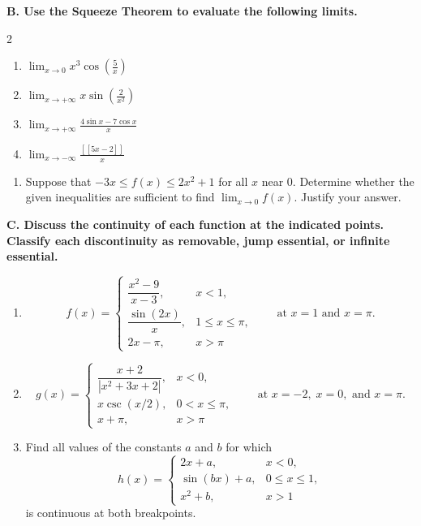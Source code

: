 \medskip
\noindent\textbf{B. Use the Squeeze Theorem to evaluate the following limits.}
\begin{multicols}{2}
\begin{enumerate}
    \setlength{\itemsep}{3pt}
    \setlength{\parsep}{0pt}
    \setlength{\topsep}{2pt}
    \setcounter{enumi}{10}
    \item \(\displaystyle \lim_{x \to 0} x^{3} \cos\!\left(\frac{5}{x}\right)\)
    \item \(\displaystyle \lim_{x \to +\infty} x \sin\!\left(\frac{2}{x^{2}}\right)\)
    \item \(\displaystyle \lim_{x \to +\infty} \frac{4\sin x - 7\cos x}{x}\)
    \item \(\displaystyle \lim_{x \to -\infty} \frac{[\![5x - 2]\!]}{x}\)
\end{enumerate}
\end{multicols}
\begin{enumerate}
    \setlength{\itemsep}{3pt}
    \setlength{\parsep}{0pt}
    \setlength{\topsep}{0pt}
    \setcounter{enumi}{14}
    \item Suppose that \(-3x \leq f(x) \leq 2x^{2} + 1\) for all \(x\) near \(0\). Determine whether the given inequalities are sufficient to find \(\displaystyle \lim_{x \to 0} f(x)\). Justify your answer.
\end{enumerate}

\medskip
\noindent\textbf{C. Discuss the continuity of each function at the indicated points. Classify each discontinuity as removable, jump essential, or infinite essential.}
\begin{enumerate}
    \setlength{\itemsep}{4pt}
    \setlength{\parsep}{0pt}
    \setlength{\topsep}{2pt}
    \setcounter{enumi}{14}
    \item
    \[
    f(x) = \begin{cases}
    \dfrac{x^{2} - 9}{x - 3}, & x < 1, \\[8pt]
    \dfrac{\sin(2x)}{x}, & 1 \leq x \leq \pi, \\[8pt]
    2x - \pi, & x > \pi
    \end{cases}
    \qquad\text{at } x = 1 \text{ and } x = \pi.
    \]

    \item
    \[
    g(x) = \begin{cases}
    \dfrac{x + 2}{|x^{2} + 3x + 2|}, & x < 0, \\[10pt]
    x \csc(x/2), & 0 < x \leq \pi, \\[6pt]
    x + \pi, & x > \pi
    \end{cases}
    \qquad\text{at } x = -2,\; x = 0, \text{ and } x = \pi.
    \]

    \item Find all values of the constants \(a\) and \(b\) for which
    \[
    h(x) = \begin{cases}
    2x + a, & x < 0, \\[4pt]
    \sin(bx) + a, & 0 \leq x \leq 1, \\[4pt]
    x^{2} + b, & x > 1
    \end{cases}
    \]
    is continuous at both breakpoints.
\end{enumerate}

